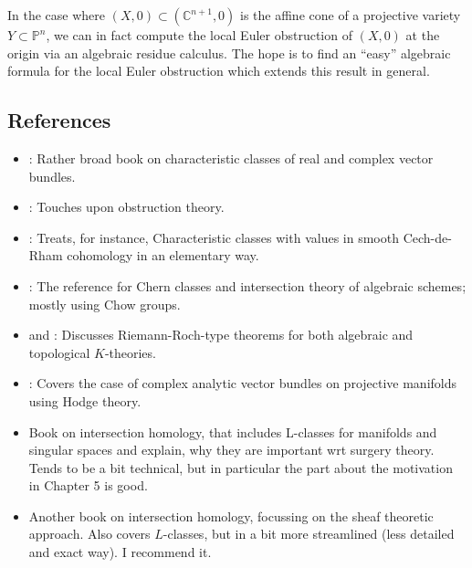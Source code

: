 \documentclass[a4paper]{article}
\begin{document}
In the case where $(X,0) \subset (\mathbb{C}^{n+1}, 0)$ is the affine cone 
of a projective variety $Y \subset \mathbb{P}^n$, we can in fact 
compute the local Euler obstruction of $(X,0)$ at the origin 
via an algebraic residue calculus. 
The hope is to find 
an ``easy'' algebraic formula for the local Euler obstruction 
which extends this result in general. 


\subsection{References} 
\begin{itemize}
  \item \cite{MilnorStasheff74}: Rather broad book on characteristic classes of real and 
    complex vector bundles.
  \item \cite{Husemoeller94}: Touches upon obstruction theory. 
  \item \cite{BottTu82}: Treats, for instance, Characteristic classes with values in smooth Cech-de-Rham 
    cohomology in an elementary way.
  \item \cite{Fulton98}: The reference for Chern classes and intersection theory 
    of algebraic schemes; mostly using Chow groups.
  \item \cite{BaumFultonMacPherson79} and \cite{BaumFultonMacPherson75}: 
    Discusses Riemann-Roch-type theorems for both algebraic 
    and topological $K$-theories.
  \item \cite{Atiyah56}: Covers the case of complex analytic vector bundles on 
    projective manifolds using Hodge theory.
  \item \cite{Banagl07} Book on intersection homology, that includes L-classes for manifolds 
	and singular spaces and explain, why they are important wrt surgery theory. Tends to
	be a bit technical, but in particular the part about the motivation in Chapter 5 is good.
  \item \cite{Maxim19} Another book on intersection homology, focussing on the sheaf theoretic approach.
	Also covers $L$-classes, but in a bit more streamlined (less detailed and exact way). I recommend it.
\end{itemize}

\printbibliography
\end{document}

